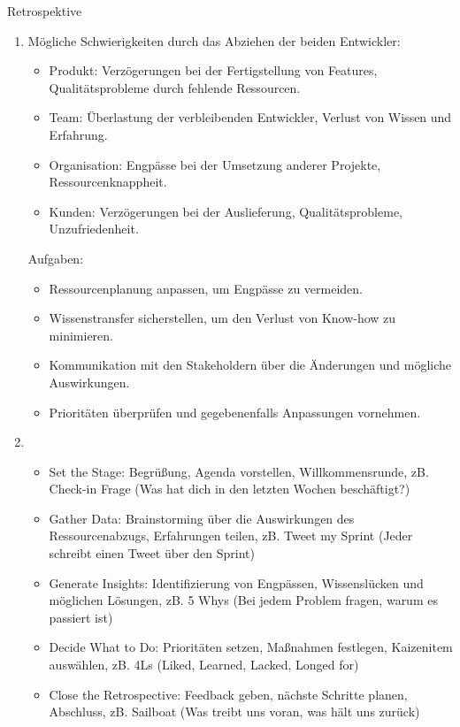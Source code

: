 \documentclass{article}
\begin{document}
\begin{exercise}{Retrospektive}
  \begin{solution}
    \begin{enumerate}
      \item Mögliche Schwierigkeiten durch das Abziehen der beiden Entwickler:
            \begin{itemize}
              \item Produkt: Verzögerungen bei der Fertigstellung von Features, Qualitätsprobleme durch fehlende Ressourcen.
              \item Team: Überlastung der verbleibenden Entwickler, Verlust von Wissen und Erfahrung.
              \item Organisation: Engpässe bei der Umsetzung anderer Projekte, Ressourcenknappheit.
              \item Kunden: Verzögerungen bei der Auslieferung, Qualitätsprobleme, Unzufriedenheit.
            \end{itemize}
            Aufgaben:
            \begin{itemize}
              \item Ressourcenplanung anpassen, um Engpässe zu vermeiden.
              \item Wissenstransfer sicherstellen, um den Verlust von Know-how zu minimieren.
              \item Kommunikation mit den Stakeholdern über die Änderungen und mögliche Auswirkungen.
              \item Prioritäten überprüfen und gegebenenfalls Anpassungen vornehmen.
            \end{itemize}
      \item
            \begin{itemize}
              \item Set the Stage: Begrüßung, Agenda vorstellen, Willkommensrunde, zB. Check-in Frage (Was hat dich in den letzten Wochen beschäftigt?)
              \item Gather Data: Brainstorming über die Auswirkungen des Ressourcenabzugs, Erfahrungen teilen, zB. Tweet my Sprint (Jeder schreibt einen Tweet über den Sprint)
              \item Generate Insights: Identifizierung von Engpässen, Wissenslücken und möglichen Lösungen, zB. 5 Whys (Bei jedem Problem fragen, warum es passiert ist)
              \item Decide What to Do: Prioritäten setzen, Maßnahmen festlegen, Kaizenitem auswählen, zB. 4Ls (Liked, Learned, Lacked, Longed for)
              \item Close the Retrospective: Feedback geben, nächste Schritte planen, Abschluss, zB. Sailboat (Was treibt uns voran, was hält uns zurück)
            \end{itemize}
    \end{enumerate}
  \end{solution}
\end{exercise}
\end{document}

